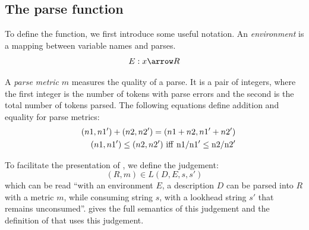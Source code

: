 \subsection{The parse function}
\label{sec:parse}
To define the  function, we first introduce some useful notation.
An {\em environment} is a mapping between variable names and parses.
\[E : x \arrow R \]

A {\em parse metric} $m$ measures the quality of a parse. It is a 
pair of integers, where the first integer is the number of tokens
with parse errors and the second is the total number of tokens parsed.
The following equations define addition and equality for parse metrics:
\begin{eqnarray*}
&&(n1, n1') + (n2, n2') = (n1 + n2, n1' + n2')  \\ 
&&(n1,n1') \le (n2,n2')~\rm{iff}~ n1/n1' \le n2/n2' 
\end{eqnarray*}

To facilitate the presentation of , we define the judgement:
\[(R, m) \in L(D, E, s, s')\]
which can be read ``with an environment $E$, a description $D$
can be parsed into $R$ with a metric $m$, while consuming
string $s$, with a lookhead string $s'$ that remains unconsumed''.
 gives the full semantics of this judgement and
the definition of  that uses this judgement.

